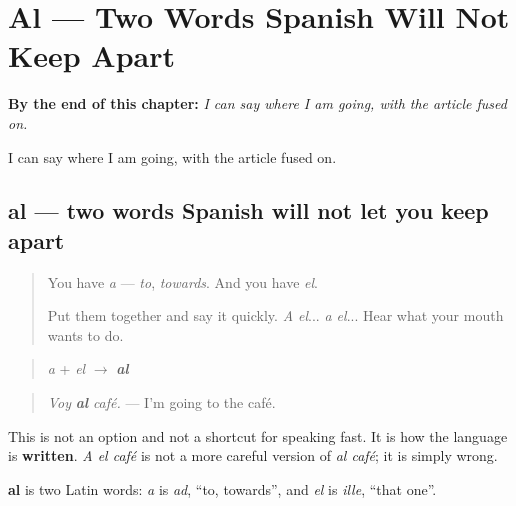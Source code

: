 
\chapter{Al --- Two Words Spanish Will Not Keep Apart}
\label{ch:al}

\begin{chapteropening}
\textbf{By the end of this chapter:} \emph{I can say where I am going, with the article fused on.}

I can say where I am going, with the article fused on.
\end{chapteropening}

\section[al]{al — two words Spanish will not let you keep apart}

\label{lesson:ES-C61-al}



\begin{quote}
You have \emph{a} — \emph{to}, \emph{towards}. And you have \emph{el}.

Put them together and say it quickly. \emph{A el}... \emph{a el}... Hear what your mouth wants to do.
\end{quote}

\begin{grammarlens}[title={Grammar Lens: the squeeze}]
\begin{quote}
\emph{a} + \emph{el} $\to$ \emph{\textbf{al}}
\end{quote}

\begin{quote}
\emph{Voy} \emph{\textbf{al}} \emph{café.} — I'm going to the café.
\end{quote}

This is not an option and not a shortcut for speaking fast. It is how the language is \textbf{written}. \emph{A el café} is not a more careful version of \emph{al café}; it is simply wrong.
\end{grammarlens}

\begin{cousinweb}
\textbf{al} is two Latin words: \emph{a} is \emph{ad}, \textquotedblleft{}to, towards\textquotedblright{}, and \emph{el} is \emph{ille}, \textquotedblleft{}that one\textquotedblright{}.
\end{cousinweb}

